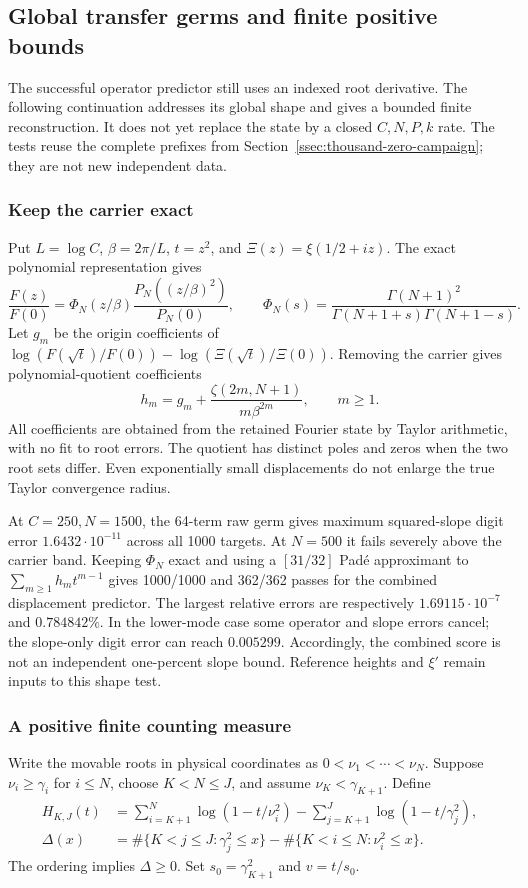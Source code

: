 \subsection{Global transfer germs and finite positive bounds}
\label{sec:transfer-germ-bounds}

The successful operator predictor still uses an indexed root derivative.
The following continuation addresses its global shape and gives a bounded
finite reconstruction. It does not yet replace the state by a closed
$C,N,P,k$ rate. The tests reuse the complete prefixes from
Section~\ref{ssec:thousand-zero-campaign}; they are not new independent data.

\subsubsection{Keep the carrier exact}
Put $L=\log C$, $\beta=2\pi/L$, $t=z^2$, and
$\Xi(z)=\xi(1/2+iz)$. The exact polynomial representation gives
\[
 \frac{F(z)}{F(0)}=\Phi_N(z/\beta)
   \frac{P_N((z/\beta)^2)}{P_N(0)},\qquad
 \Phi_N(s)=\frac{\Gamma(N+1)^2}
 {\Gamma(N+1+s)\Gamma(N+1-s)}.
\]
Let $g_m$ be the origin coefficients of
$\log(F(\sqrt t)/F(0))-\log(\Xi(\sqrt t)/\Xi(0))$. Removing the carrier
gives polynomial-quotient coefficients
\begin{equation}\label{eq:transfer-germ-coefficients}
 h_m=g_m+\frac{\zeta(2m,N+1)}{m\beta^{2m}},\qquad m\ge1.
\end{equation}
All coefficients are obtained from the retained Fourier state by Taylor
arithmetic, with no fit to root errors. The quotient has distinct poles
and zeros when the two root sets differ. Even exponentially small
displacements do not enlarge the true Taylor convergence radius.

At $C=250,N=1500$, the 64-term raw germ gives maximum squared-slope
digit error $1.6432\cdot10^{-11}$ across all 1000 targets. At $N=500$
it fails severely above the carrier band. Keeping $\Phi_N$ exact and
using a $[31/32]$ Pad\'e approximant to $\sum_{m\ge1}h_m t^{m-1}$ gives
1000/1000 and 362/362 passes for the combined displacement predictor.
The largest relative errors are respectively $1.69115\cdot10^{-7}$
and $0.784842\%$. In the lower-mode case some operator and slope errors
cancel; the slope-only digit error can reach $0.005299$. Accordingly,
the combined score is not an independent one-percent slope bound.
Reference heights and $\xi'$ remain inputs to this shape test.

\subsubsection{A positive finite counting measure}
Write the movable roots in physical coordinates as
$0<\nu_1<\cdots<\nu_N$. Suppose $\nu_i\ge\gamma_i$ for $i\le N$,
choose $K<N\le J$, and assume $\nu_K<\gamma_{K+1}$. Define
\begin{align*}
 H_{K,J}(t)&=\sum_{i=K+1}^{N}\log(1-t/\nu_i^2)
             -\sum_{j=K+1}^{J}\log(1-t/\gamma_j^2),\\
 \Delta(x)&=\#\{K<j\le J:\gamma_j^2\le x\}
             -\#\{K<i\le N:\nu_i^2\le x\}.
\end{align*}
The ordering implies $\Delta\ge0$. Set $s_0=\gamma_{K+1}^2$ and $v=t/s_0$.

